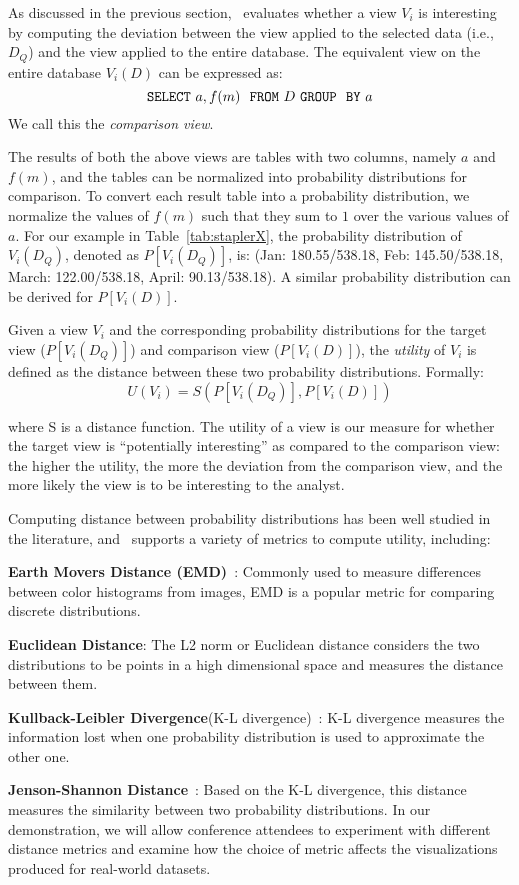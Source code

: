 As discussed in the previous section, \SeeDB\ evaluates
whether a view $V_i$ is interesting
by computing the deviation between the view applied to the selected data (i.e., $D_Q$) 
and the view applied to the entire database.
The equivalent view on the entire database $V_i (D)$ can be expressed as:
$${\tt SELECT \ } a, f(m) \ \ {\tt FROM} \  D\  {\tt GROUP \ \ BY} \ a$$
We call this the {\em comparison view}.

The results of both the above views are tables with two columns, namely $a$ and
$f(m)$, and the tables can be normalized into probability distributions for
comparison. To convert each result table into a probability distribution, we
normalize the values of $f(m)$ such that they sum to $1$ over the various values
of $a$.
For our example in Table~\ref{tab:staplerX}, the probability distribution of
$V_i(D_Q)$, denoted as $P[V_i (D_Q)]$, is: (Jan: 180.55/538.18, Feb:
145.50/538.18, March: 122.00/538.18,  April: 90.13/538.18). A similar
probability distribution can be derived for $P[V_i (D)]$.

Given a view $V_i$ and the corresponding probability distributions for the
target view  ($P[V_i (D_Q)]$) and comparison view ($P[V_i (D)]$), the
{\em utility} of $V_i$ is defined as the distance between these two probability
distributions.
Formally:
$$ U (V_i) = S ( P[V_i (D_Q)], P[V_i (D)] )$$

where S is a distance function. The utility of a view is our measure for whether
the target view is ``potentially interesting'' as compared to the comparison view: 
the higher the utility, the more the deviation
from the comparison view, and the more likely the view is to be interesting to the analyst.

Computing distance between probability distributions has
been well studied in the literature, and \SeeDB\ supports a variety of metrics
to compute utility, including:
\squishlist
  \item {\bf Earth Movers Distance (EMD)}~\cite{wikipedia-prob-dist}: Commonly used to
  measure differences between color histograms from images, EMD is a popular metric for comparing
  discrete distributions.
  \item {\bf Euclidean Distance}: The L2 norm or
  Euclidean distance considers the two distributions to be points in a high
  dimensional space and measures the distance between them.
  \item {\bf Kullback-Leibler Divergence}(K-L divergence)~\cite{wikipedia-KL}:
  K-L divergence measures the information lost when one probability distribution is used to approximate
  the other one.
  \item {\bf Jenson-Shannon Distance}~\cite{wikipedia-JS,entropy-vis}: Based on
  the K-L divergence, this distance measures the similarity between two probability distributions.
\squishend
In our demonstration, we will allow conference attendees to experiment with
different distance metrics and examine how the choice of metric affects the
visualizations produced for real-world datasets.

